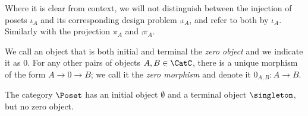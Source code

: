 \begin{remark}Where it is clear from context, we will not distinguish between the injection of posets $\iota_A$ and its corresponding design problem $\comp{\iota_A}$, and refer to both by $\iota_A$. Similarly with the projection $\pi_A$ and $\comp{\pi_A}$.
\end{remark}

\begin{table}[b]
\caption{A comparison of $\Pos, \Set$, and $\DP$.}
\end{table}

\begin{shaded}
\begin{definition}
We call an object that is both initial and terminal the \emph{zero object} and we indicate it as $0$. For any other pairs of objects  $A, B\in\CatC$, there is a unique morphism of the form $A \to 0\to B$; we call it the \emph{zero morphism} and denote it $0_{A,B}\colon A \to B$.
\end{definition}
\end{shaded}

\begin{example}The category $\Poset$ has an initial object $\emptyset$ and a terminal object $\singleton$, but no zero object.\end{example}

